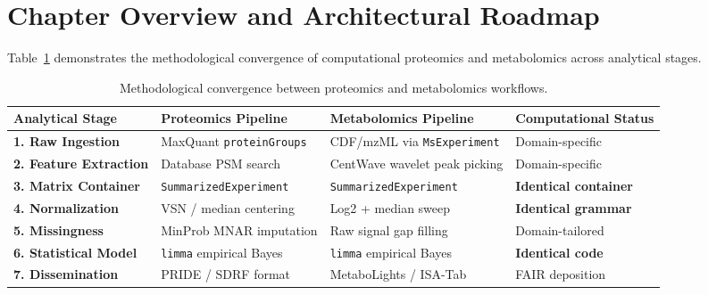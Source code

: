 \documentclass[11pt,twoside,openright]{book}
\begin{document}
\vspace{1em}
\section*{Chapter Overview and Architectural Roadmap}

Table~\ref{tab:capstone_roadmap} demonstrates the methodological convergence of computational proteomics and metabolomics across analytical stages.

\begin{table}[htbp]
\centering
\caption{Methodological convergence between proteomics and metabolomics workflows.}
\label{tab:capstone_roadmap}
\small
\begin{tabularx}{\textwidth}{>{\raggedright\arraybackslash}l >{\raggedright\arraybackslash}p{3.5cm} >{\raggedright\arraybackslash}p{3.5cm} >{\raggedright\arraybackslash}X}
\toprule
\textbf{Analytical Stage} & \textbf{Proteomics Pipeline} & \textbf{Metabolomics Pipeline} & \textbf{Computational Status} \\
\midrule
\textbf{1. Raw Ingestion} & MaxQuant \texttt{proteinGroups} & CDF/mzML via \texttt{MsExperiment} \cite{rainer2022msexperiment} & Domain-specific \\
\addlinespace
\textbf{2. Feature Extraction} & Database PSM search & CentWave wavelet peak picking \cite{tautenhahn2008centwave} & Domain-specific \\
\addlinespace
\textbf{3. Matrix Container} & \texttt{SummarizedExperiment} \cite{huber2015orchestrating} & \texttt{SummarizedExperiment} \cite{huber2015orchestrating} & \textbf{Identical container} \\
\addlinespace
\textbf{4. Normalization} & VSN \cite{huber2002vsn} / median centering & Log2 + median sweep & \textbf{Identical grammar} \\
\addlinespace
\textbf{5. Missingness} & MinProb MNAR imputation \cite{lazar2016accounting} & Raw signal gap filling \cite{benton2015evaluating} & Domain-tailored \\
\addlinespace
\textbf{6. Statistical Model} & \texttt{limma} empirical Bayes \cite{smyth2004limma} & \texttt{limma} empirical Bayes \cite{smyth2004limma} & \textbf{Identical code} \\
\addlinespace
\textbf{7. Dissemination} & PRIDE / SDRF format \cite{deutsch2020pride} & MetaboLights / ISA-Tab \cite{haug2020metabolights} & FAIR deposition \cite{wilkinson2016fair} \\
\bottomrule
\end{tabularx}
\end{table}
\end{document}
